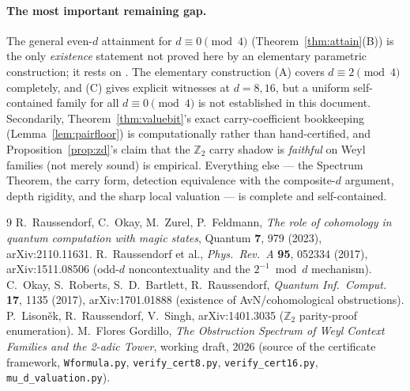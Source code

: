 \documentclass[11pt]{article}
\theoremstyle{definition}
\theoremstyle{remark}
\newcommand{\Z}{\mathbb{Z}}
\begin{document}
\paragraph{The most important remaining gap.} The general even-$d$ attainment for $d\equiv0\pmod4$
(Theorem~\ref{thm:attain}(B)) is the only \emph{existence} statement not proved here by an
elementary parametric construction; it rests on \cite{ROZF}. The elementary construction (A) covers
$d\equiv2\pmod4$ completely, and (C) gives explicit witnesses at $d=8,16$, but a uniform
self-contained family for all $d\equiv0\pmod4$ is not established in this document. Secondarily,
Theorem~\ref{thm:valuebit}'s exact carry-coefficient bookkeeping (Lemma~\ref{lem:pairfloor}) is
computationally rather than hand-certified, and Proposition~\ref{prop:zd}'s claim that the $\Z_2$
carry shadow is \emph{faithful} on Weyl families (not merely sound) is empirical. Everything else ---
the Spectrum Theorem, the carry form, detection equivalence with the composite-$d$ argument, depth
rigidity, and the sharp local valuation --- is complete and self-contained.

\begin{thebibliography}{9}
 R.~Raussendorf, C.~Okay, M.~Zurel, P.~Feldmann,
\emph{The role of cohomology in quantum computation with magic states}, Quantum \textbf{7}, 979
(2023), arXiv:2110.11631.
 R.~Raussendorf et al., \emph{Phys.\ Rev.\ A} \textbf{95}, 052334 (2017),
arXiv:1511.08506 (odd-$d$ noncontextuality and the $2^{-1}\bmod d$ mechanism).
 C.~Okay, S.~Roberts, S.~D.~Bartlett, R.~Raussendorf,
\emph{Quantum Inf.\ Comput.} \textbf{17}, 1135 (2017), arXiv:1701.01888
(existence of AvN/cohomological obstructions).
 P.~Lison\v{e}k, R.~Raussendorf, V.~Singh, arXiv:1401.3035
($\Z_2$ parity-proof enumeration).
 M.~Flores Gordillo, \emph{The Obstruction Spectrum of Weyl Context Families and the
2-adic Tower}, working draft, 2026 (source of the certificate framework, \texttt{Wformula.py},
\texttt{verify\_cert8.py}, \texttt{verify\_cert16.py}, \texttt{mu\_d\_valuation.py}).
\end{thebibliography}
\end{document}
